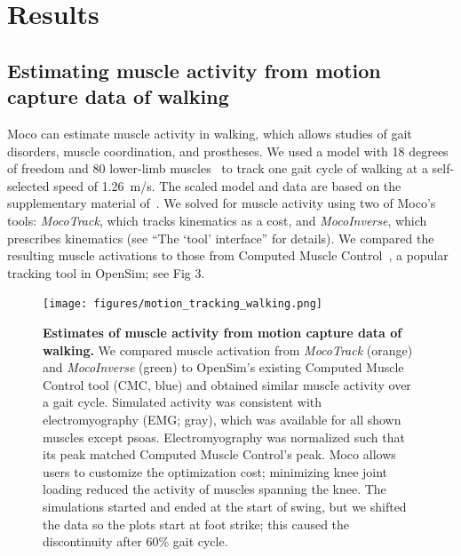 \documentclass[10pt,letterpaper]{article}
\begin{document}
\section*{Results}

\subsection*{Estimating muscle activity from motion capture data of walking}

Moco can estimate muscle activity in walking, which allows studies of gait disorders, muscle coordination, and prostheses. We used a model with 18 degrees of freedom and 80 lower-limb muscles~\cite{Rajagopal:2016ek} to track one gait cycle of walking at a self-selected speed of 1.26~m/s. The scaled model and data are based on the supplementary material of~\cite{Rajagopal:2016ek}. We solved for muscle activity using two of Moco’s tools: \textit{MocoTrack}, which tracks kinematics as a cost, and \textit{MocoInverse}, which prescribes kinematics (see “The ‘tool’ interface” for details). We compared the resulting muscle activations to those from Computed Muscle Control~\cite{Thelen:2003bba}, a popular tracking tool in OpenSim; see Fig 3.

\begin{figure}[!h]
        \begin{adjustwidth}{-2.25in}{0in} %
    \centering
    \texttt{[image: figures/motion\_tracking\_walking.png]}
    \caption{{\bf Estimates of muscle activity from motion capture data of walking.}
    We compared muscle activation from \textit{MocoTrack} (orange) and \textit{MocoInverse} (green) to OpenSim’s existing Computed Muscle Control tool (CMC, blue) and obtained similar muscle activity over a gait cycle. Simulated activity was consistent with electromyography (EMG; gray), which was available for all shown muscles except psoas. Electromyography was normalized such that its peak matched Computed Muscle Control's peak. Moco allows users to customize the optimization cost; minimizing knee joint loading reduced the activity of muscles spanning the knee. The simulations started and ended at the start of swing, but we shifted the data so the plots start at foot strike; this caused the discontinuity after 60\% gait cycle.}
    \label{walking}
        \end{adjustwidth}
\end{figure}
\end{document}
